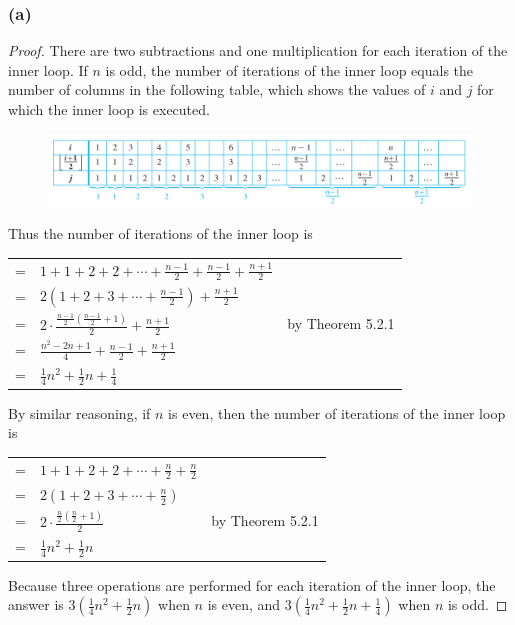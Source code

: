 \documentclass[14pt]{extarticle}
\newcommand{\dps}{\displaystyle}
\newcommand{\cy}{\color{cyan}}
\begin{document}
\subsubsection{(a)}
\begin{proof}
There are two subtractions and one multiplication for each iteration of the inner loop. If \(n\) is odd, the number of 
iterations of the inner loop equals the number of columns in the following table, which shows the values of \(i\) and \(j\) 
for which the inner loop is executed.

\begin{figure}[ht!]
\centering
\includegraphics[scale=0.45]{../images/11.3.17.a.png}
\end{figure}

Thus the number of iterations of the inner loop is

\begin{tabular}{rll}
= & \(\dps 1+1+2+2+\cdots+\frac{n-1}{2}+\frac{n-1}{2}+\frac{n+1}{2}\) & {\cy }\\
= & \(\dps 2\left(1+2+3+\cdots+\frac{n-1}{2}\right)+\frac{n+1}{2}\) & {\cy }\\
= & \(\dps 2 \cdot \frac{\frac{n-1}{2}\left(\frac{n-1}{2}+1\right)}{2} + \frac{n+1}{2}\) & {\cy by Theorem 5.2.1}\\
= & \(\dps \frac{n^2-2n+1}{4} + \frac{n-1}{2} + \frac{n+1}{2}\) & {\cy }\\
= & \(\dps \frac{1}{4}n^2+\frac{1}{2}n+\frac{1}{4}\) & {\cy }
\end{tabular}

By similar reasoning, if \(n\) is even, then the number of iterations of the inner loop is

\begin{tabular}{rll}
= & \(\dps 1+1+2+2+\cdots+\frac{n}{2}+\frac{n}{2}\) & {\cy }\\
= & \(\dps 2\left(1+2+3+\cdots+\frac{n}{2}\right)\) & {\cy }\\
= & \(\dps 2 \cdot \frac{\frac{n}{2}\left(\frac{n}{2} + 1 \right)}{2}\) & {\cy by Theorem 5.2.1}\\
= & \(\dps \frac{1}{4}n^2+\frac{1}{2}n\) & {\cy }
\end{tabular}

Because three operations are performed for each iteration of the inner loop, the answer is \(\dps 3 \left(\frac{1}{4}n^2+
\frac{1}{2}n\right)\) when \(n\) is even, and \(\dps 3 \left(\frac{1}{4}n^2+\frac{1}{2}n+\frac{1}{4}\right)\) when 
\(n\) is odd.
\end{proof}
\end{document}
